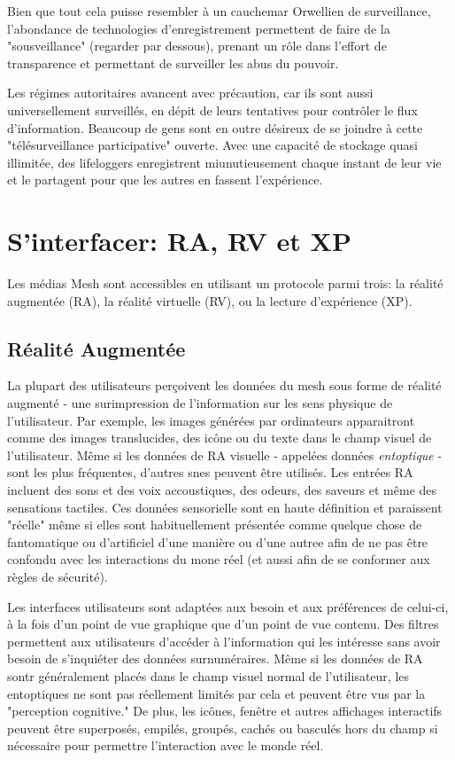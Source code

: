 Bien que tout cela puisse resembler à un cauchemar Orwellien de surveillance, l'abondance de technologies d'enregistrement permettent de faire de la "sousveillance" (regarder par dessous), prenant un rôle dans l'effort de transparence et permettant de surveiller les abus du pouvoir. 

Les régimes autoritaires avancent avec précaution, car ils sont aussi universellement surveillés, en dépit de leurs tentatives pour contrôler le flux d'information. Beaucoup de gens sont en outre désireux de se joindre à cette "télésurveillance participative" ouverte. Avec une capacité de stockage quasi illimitée, des lifeloggers enregistrent miunutieusement chaque instant de leur vie et le partagent pour que les autres en fassent l'expérience. 

\section{S'interfacer: RA, RV et XP} 

Les médias Mesh sont accessibles en utilisant un protocole parmi trois: la réalité augmentée (RA), la réalité virtuelle (RV), ou la lecture d'expérience (XP). 

\subsection{Réalité Augmentée} 

La plupart des utilisateurs perçoivent les données du mesh sous forme de réalité augmenté - une surimpression de l'information sur les sens physique de l'utilisateur. Par exemple, les images générées par ordinateurs apparaitront comme des images translucides, des icône ou du texte dans le champ visuel de l'utilisateur. Même si les données de RA visuelle - appelées données \textit{entoptique} - sont les plus fréquentes, d'autres snes peuvent être utilisés. Les entrées RA incluent des sons et des voix accoustiques, des odeurs, des saveurs et même des sensations tactiles. Ces données sensorielle sont en haute définition et paraissent "réelle" même si elles sont habituellement présentée comme quelque chose de fantomatique ou d'artificiel d'une manière ou d'une autree afin de ne pas être confondu avec les interactions du mone réel (et aussi afin de se conformer aux règles de sécurité). 

Les interfaces utilisateurs sont adaptées aux besoin et aux préférences de celui-ci, à la fois d'un point de vue graphique que d'un point de vue contenu. Des filtres permettent aux utilisateurs d'accéder à l'information qui les intéresse sans avoir besoin de s'inquiéter des données surnuméraires. Même si les données de RA sontr généralement placés dans le champ visuel normal de l'utilisateur, les entoptiques ne sont pas réellement limités par cela et peuvent être vus par la "perception cognitive." De plus, les icônes, fenêtre et autres affichages interactifs peuvent être superposés, empilés, groupés, cachés ou basculés hors du champ si nécessaire pour permettre l'interaction avec le monde réel. 

